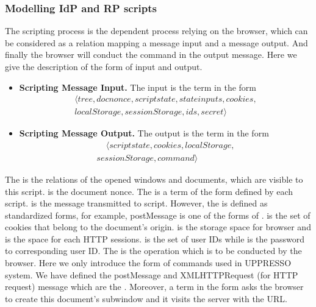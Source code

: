 \subsubsection{Modelling IdP and RP scripts}
The scripting process is the dependent process relying on the browser, which can be considered as a relation  mapping a message input and a message output. And finally the browser will conduct the command in the output message. Here we give the description of the form of input and output.
\begin{itemize}
\setlength\itemsep{-2pt}
\item \textbf{Scripting Message Input. } The input is the term in the form
\begin{multline*}
\langle tree, docnonce, scriptstate, stateinputs,cookies,\\
localStorage, sessionStorage, ids, secret \rangle
\end{multline*}
\item \textbf{Scripting Message Output. }The output is the term in the form
\begin{multline*}
\ \ \ \ \ \langle scriptstate, cookies, localStorage, \\
sessionStorage, command \rangle \ \ \ \ \
\end{multline*}
\end{itemize}
The  is the relations of the opened windows and documents, which are visible to this script.  is the document nonce. The   is a term of the form defined by each script.  is the message transmitted to script. However, the  is defined as standardized forms, for example, postMessage is one of the forms of .  is the set of cookies that belong to the document's origin.  is the storage space for browser and  is the space for each HTTP sessions.   is the set of user IDs while  is the password to corresponding user ID. The  is the operation which is to be conducted by the browser. Here we only introduce the form of commands used in UPPRESSO system. We have defined the postMessage and XMLHTTPRequest (for HTTP request) message which are the . Moreover, a term in the form  asks the browser to create this document's subwindow and it visits the server with the URL.

